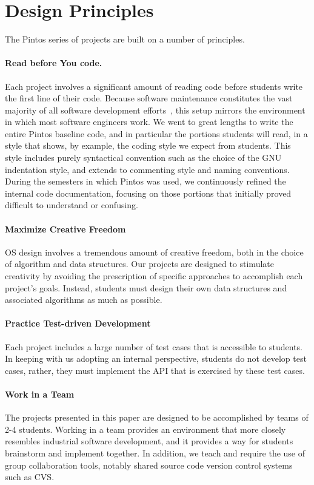 \section{Design Principles}
\label{sec:designprinciples}

The Pintos series of projects are built on a number of principles.

\paragraph{Read before You code.}
Each project involves a significant amount of reading code before
students write the first line of their code.  
Because software maintenance constitutes the vast majority of all
software development efforts~\cite{askEliforcite}, this setup mirrors the 
environment in which most software engineers work.
We went to great lengths to write the entire Pintos baseline code,
and in particular the portions students will read, in a style that shows,
by example, the coding style we expect from students.  This style
includes purely syntactical convention such as the choice of the
GNU indentation style, and extends to commenting style and naming 
conventions.  During the semesters in which Pintos was used, we
continuously refined the internal code documentation, focusing on those 
portions that initially proved difficult to understand or confusing.

\paragraph{Maximize Creative Freedom}
OS design involves a tremendous amount of creative freedom, both in the
choice of algorithm and data structures.  Our projects are designed to
stimulate creativity by avoiding the prescription of specific approaches
to accomplish each project's goals.  Instead, students must design their
own data structures and associated algorithms as much as possible.

\paragraph{Practice Test-driven Development}
Each project includes a large number of test cases that is accessible
to students.  In keeping with us adopting an internal perspective, students 
do not develop test cases, rather, they must implement the API that is exercised
by these test cases.

\paragraph{Work in a Team}
The projects presented in this paper are designed to be accomplished by teams of 
2-4 students.  Working in a team provides an environment that more closely resembles
industrial software development, and it provides a way for students brainstorm and
implement together.  In addition, we teach and require the use of group collaboration tools,
notably shared source code version control systems such as CVS.

